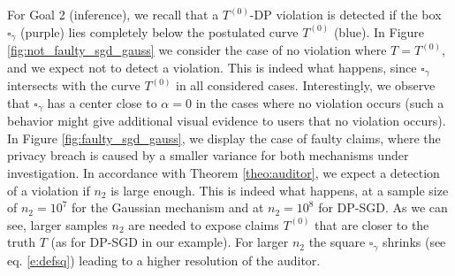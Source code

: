 For Goal 2 (inference), we recall that a  $T^{(0)}$-DP violation is detected if the box $\square_\gamma$ (purple) lies completely below the postulated curve $T^{(0)}$ (blue). In Figure \ref{fig:not_faulty_sgd_gauss} we consider the case of no violation where $T=T^{(0)}$, and we expect not to detect a violation. This is indeed what happens, since $\square_\gamma$ intersects with the curve $T^{(0)}$ in all considered cases. Interestingly, we observe that $\square_\gamma$ has a center close to $\alpha=0$ in the cases where no violation occurs (such a behavior might give additional visual evidence to users that no violation occurs).
In Figure \ref{fig:faulty_sgd_gauss}, we display the case of faulty claims, where the privacy breach is caused by a smaller variance for both mechanisms under investigation. In accordance with Theorem \ref{theo:auditor}, we expect a detection of a violation if $n_2$ is large enough. This is indeed what happens, at a sample size of $n_2=10^7$ for the Gaussian mechanism and at  $n_2=10^8$ for DP-SGD. As we can see, larger samples $n_2$ are needed to expose claims $T^{(0)}$ that are closer to the truth $T$ (as for DP-SGD in our example). For larger $n_2$ the square $\square_\gamma$ shrinks (see eq. \eqref{e:defsq}) leading to a higher resolution of the auditor. 
